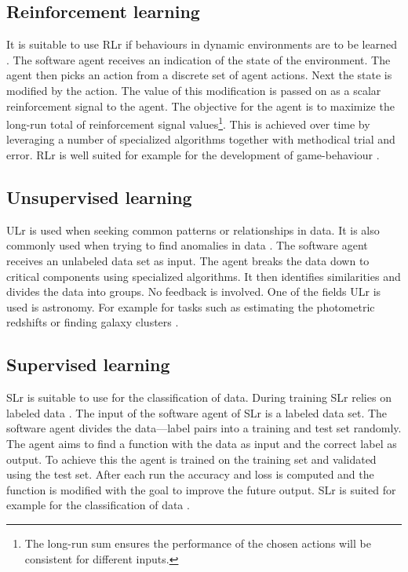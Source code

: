 \subsection{Reinforcement learning} \label{reinforcementLearning}
It is suitable to use RLr if behaviours in dynamic environments are to be learned \cite{reinforcementLearningIntroduction}. The software agent receives an indication of the state of the environment. The agent then picks an action from a discrete set of agent actions. Next the state is modified by the action. The value of this modification is passed on as a scalar reinforcement signal to the agent. The objective for the agent is to maximize the long-run total of reinforcement signal values\footnote{The long-run sum ensures the performance of the chosen actions will be consistent for different inputs.}. This is achieved over time by leveraging a number of specialized algorithms together with methodical trial and error. RLr is well suited for example for the development of game-behaviour \cite{reinforcementLearningGames}.

\subsection{Unsupervised learning} \label{unsupervisedLearning}
 ULr is used when seeking common patterns or relationships in data. It is also commonly used when trying to find anomalies in data \cite{unsupervisedLearningIntroduction}. The software agent receives an unlabeled data set as input. The agent breaks the data down to critical components using specialized algorithms. It then identifies similarities and divides the data into groups. No feedback is involved. One of the fields ULr is used is astronomy. For example for tasks such as estimating the photometric  redshifts or finding galaxy clusters \cite{unsuperviseLEarningAstronomy}. 

\subsection{Supervised learning} \label{supervisedLearning}
SLr is suitable to use for the classification of data. During training SLr relies on labeled data \cite{machineLeraningApproaches}. The input of the software agent of SLr is a labeled data set. The software agent divides the data---label pairs into a training and test set randomly. The agent aims to find a function with the data as input and the correct label as output. To achieve this the agent is trained on the training set and validated using the test set. After each run the accuracy and loss is computed and the function is modified with the goal to improve the future output. SLr is suited for example for the classification of data \cite{supervisedLearningClassification}. 

